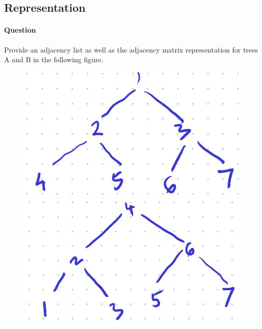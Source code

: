 \documentclass[11pt]{article}
\begin{document}
\subsection{Representation}
\label{sec:orgc198721}

\paragraph*{Question}
\label{sec:org968ac14}
Provide an adjacency list as well as the adjacency matrix
representation for trees A and B in the following figure.

\begin{figure}[!h]
\centering
\begin{minipage}{0.4\textwidth}
\centering
\includegraphics[width=\linewidth]{./images/treeA.png}
\end{minipage}
\begin{minipage}{0.5\textwidth}
\centering
\includegraphics[width=\linewidth]{./images/treeB.png}
\end{minipage}
\end{figure}
\end{document}
